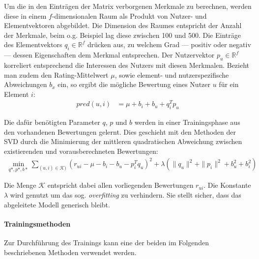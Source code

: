Um die in den Einträgen der Matrix verborgenen Merkmale zu berechnen, werden diese in einem $f$-dimensionalen Raum als Produkt von Nutzer- und Elementvektoren abgebildet. Die Dimension des Raumes entspricht der Anzahl der Merkmale, beim o.g. Beispiel lag diese zwischen 100 und 500. Die Einträge des Elementvektors $q_i \in \mathbb{R}^f$ drücken aus, zu welchem Grad --- positiv oder negativ --- dessen Eigenschaften dem Merkmal entsprechen. Der Nutzervektor $p_u \in \mathbb{R}^f$ korreliert entsprechend die Interessen des Nutzers mit diesen Merkmalen. Bezieht man zudem den Rating-Mittelwert $\mu$, sowie element- und nutzerspezifische Abweichungen $b_x$ ein, so ergibt die mögliche Bewertung eines Nutzer $u$ für ein Element $i$:
\begin{align}
pred(u,i) & = \mu + b_i + b_u + q_i^T p_u \label{form:calcpredsvd}
\end{align}

Die dafür benötigten Parameter $q$, $p$ und $b$ werden in einer Trainingsphase aus den vorhandenen Bewertungen gelernt. Dies geschieht mit den Methoden der \acf{SVD}  \citep{golub65} durch die Minimierung der mittleren quadratischen Abweichung zwischen existierenden und vorausberechneten Bewertungen:
\begin{align}
\min_{q*,p*,b*}{ \sum_{(u,i) \in \mathcal{K})} (r_{ui} -\mu-b_i - b_u - p_i^T q_u)^2  + \lambda ( \|q_u\|^2 + \|p_i\|^2 + b_u^2 + b_i^2) \label{form:trainsvd}   }
\end{align}

Die Menge $\mathcal{K}$ entspricht dabei allen vorliegenden Bewertungen $r_{ui}$. Die Konstante $\lambda$ wird genutzt um das sog. \textit{overfitting} zu verhindern. Sie stellt sicher, dass das abgeleitete Modell generisch bleibt.  \citep{Koren:2009:MFT:1608565.1608614, hb_05}

\paragraph{Trainingsmethoden} Zur Durchführung des Trainings kann eine der beiden im Folgenden beschriebenen Methoden verwendet werden.

